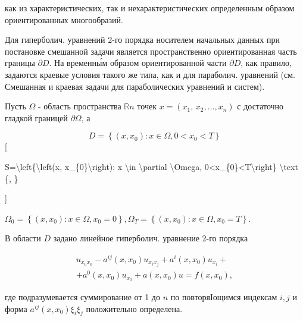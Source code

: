 \documentclass[10pt]{article}
\begin{document}
как из характеристических, так и нехарактеристических определенным образом ориентированных многообразиӥ.



Для гиперболич. уравнений 2-го порядка носителем начальных данных при постановке смешанной задачи является пространственно ориентированная часть границы $\partial D$. На временны́м образом ориентированной части $\partial D$, как правило, задаются краевые условия такого же типа, как и для параболич. уравнений (см. Смешанная и краевая задачи для параболических уравнений и систем).



Пусть $\Omega$ - область пространства $\mathbb{R} n$ точек $x=\left(x_{1}\right.$, $\left.x_{2}, \ldots, x_{n}\right)$ с достаточно гладкой границей $\partial \Omega$, а



\[

D=\left\{\left(x, x_{0}\right): x \in \Omega, 0<x_{0}<T\right\}

\][



S=\textbackslash left\{\textbackslash left(x, x\_\{0\}\textbackslash right): x \textbackslash in \textbackslash partial \textbackslash Omega, 0<x\_\{0\}<T\textbackslash right\} \textbackslash text \{, \}

]



$\Omega_{0}=\left\{\left(x, x_{0}\right): x \in \Omega, x_{0}=0\right\}, \Omega_{T}=\left\{\left(x, x_{0}\right): x \in \Omega, x_{0}=T\right\}$.



В области $D$ задано линейное гиперболич. уравнение 2-го порядка



\[

\begin{gathered}

u_{x_{0} x_{0}}-a^{i j}\left(x, x_{0}\right) u_{x_{i} x_{j}}+a^{i}\left(x, x_{0}\right) u_{x_{i}}+ \\

+a^{0}\left(x, x_{0}\right) u_{x_{0}}+a\left(x, x_{0}\right) u=f\left(x, x_{0}\right),

\end{gathered}

\]



где подразумевается суммирование от 1 до $n$ по повторяІощимся индексам $i, j$ и форма $a^{i j}\left(x, x_{0}\right) \xi_{i} \xi_{j}$ положительно определена.
\end{document}
